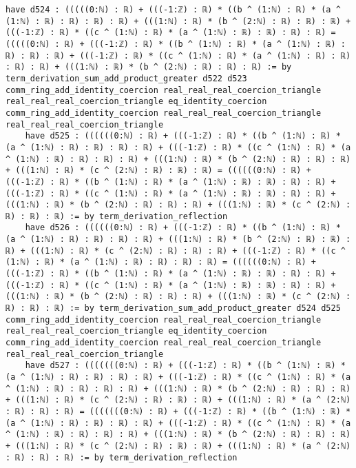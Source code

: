 \documentclass{article}
\begin{document}
\begin{tcolorbox}[colback=white!10, width=\linewidth]
\begin{lstlisting}[language=Lean4]
    have d524 : (((((0:ℕ) : ℝ) + (((-1:ℤ) : ℝ) * ((b ^ (1:ℕ) : ℝ) * (a ^ (1:ℕ) : ℝ) : ℝ) : ℝ) : ℝ) + (((1:ℕ) : ℝ) * (b ^ (2:ℕ) : ℝ) : ℝ) : ℝ) + (((-1:ℤ) : ℝ) * ((c ^ (1:ℕ) : ℝ) * (a ^ (1:ℕ) : ℝ) : ℝ) : ℝ) : ℝ) = (((((0:ℕ) : ℝ) + (((-1:ℤ) : ℝ) * ((b ^ (1:ℕ) : ℝ) * (a ^ (1:ℕ) : ℝ) : ℝ) : ℝ) : ℝ) + (((-1:ℤ) : ℝ) * ((c ^ (1:ℕ) : ℝ) * (a ^ (1:ℕ) : ℝ) : ℝ) : ℝ) : ℝ) + (((1:ℕ) : ℝ) * (b ^ (2:ℕ) : ℝ) : ℝ) : ℝ) := by term_derivation_sum_add_product_greater d522 d523 comm_ring_add_identity_coercion real_real_real_coercion_triangle real_real_real_coercion_triangle eq_identity_coercion comm_ring_add_identity_coercion real_real_real_coercion_triangle real_real_real_coercion_triangle
    have d525 : ((((((0:ℕ) : ℝ) + (((-1:ℤ) : ℝ) * ((b ^ (1:ℕ) : ℝ) * (a ^ (1:ℕ) : ℝ) : ℝ) : ℝ) : ℝ) + (((-1:ℤ) : ℝ) * ((c ^ (1:ℕ) : ℝ) * (a ^ (1:ℕ) : ℝ) : ℝ) : ℝ) : ℝ) + (((1:ℕ) : ℝ) * (b ^ (2:ℕ) : ℝ) : ℝ) : ℝ) + (((1:ℕ) : ℝ) * (c ^ (2:ℕ) : ℝ) : ℝ) : ℝ) = ((((((0:ℕ) : ℝ) + (((-1:ℤ) : ℝ) * ((b ^ (1:ℕ) : ℝ) * (a ^ (1:ℕ) : ℝ) : ℝ) : ℝ) : ℝ) + (((-1:ℤ) : ℝ) * ((c ^ (1:ℕ) : ℝ) * (a ^ (1:ℕ) : ℝ) : ℝ) : ℝ) : ℝ) + (((1:ℕ) : ℝ) * (b ^ (2:ℕ) : ℝ) : ℝ) : ℝ) + (((1:ℕ) : ℝ) * (c ^ (2:ℕ) : ℝ) : ℝ) : ℝ) := by term_derivation_reflection
    have d526 : ((((((0:ℕ) : ℝ) + (((-1:ℤ) : ℝ) * ((b ^ (1:ℕ) : ℝ) * (a ^ (1:ℕ) : ℝ) : ℝ) : ℝ) : ℝ) + (((1:ℕ) : ℝ) * (b ^ (2:ℕ) : ℝ) : ℝ) : ℝ) + (((1:ℕ) : ℝ) * (c ^ (2:ℕ) : ℝ) : ℝ) : ℝ) + (((-1:ℤ) : ℝ) * ((c ^ (1:ℕ) : ℝ) * (a ^ (1:ℕ) : ℝ) : ℝ) : ℝ) : ℝ) = ((((((0:ℕ) : ℝ) + (((-1:ℤ) : ℝ) * ((b ^ (1:ℕ) : ℝ) * (a ^ (1:ℕ) : ℝ) : ℝ) : ℝ) : ℝ) + (((-1:ℤ) : ℝ) * ((c ^ (1:ℕ) : ℝ) * (a ^ (1:ℕ) : ℝ) : ℝ) : ℝ) : ℝ) + (((1:ℕ) : ℝ) * (b ^ (2:ℕ) : ℝ) : ℝ) : ℝ) + (((1:ℕ) : ℝ) * (c ^ (2:ℕ) : ℝ) : ℝ) : ℝ) := by term_derivation_sum_add_product_greater d524 d525 comm_ring_add_identity_coercion real_real_real_coercion_triangle real_real_real_coercion_triangle eq_identity_coercion comm_ring_add_identity_coercion real_real_real_coercion_triangle real_real_real_coercion_triangle
    have d527 : (((((((0:ℕ) : ℝ) + (((-1:ℤ) : ℝ) * ((b ^ (1:ℕ) : ℝ) * (a ^ (1:ℕ) : ℝ) : ℝ) : ℝ) : ℝ) + (((-1:ℤ) : ℝ) * ((c ^ (1:ℕ) : ℝ) * (a ^ (1:ℕ) : ℝ) : ℝ) : ℝ) : ℝ) + (((1:ℕ) : ℝ) * (b ^ (2:ℕ) : ℝ) : ℝ) : ℝ) + (((1:ℕ) : ℝ) * (c ^ (2:ℕ) : ℝ) : ℝ) : ℝ) + (((1:ℕ) : ℝ) * (a ^ (2:ℕ) : ℝ) : ℝ) : ℝ) = (((((((0:ℕ) : ℝ) + (((-1:ℤ) : ℝ) * ((b ^ (1:ℕ) : ℝ) * (a ^ (1:ℕ) : ℝ) : ℝ) : ℝ) : ℝ) + (((-1:ℤ) : ℝ) * ((c ^ (1:ℕ) : ℝ) * (a ^ (1:ℕ) : ℝ) : ℝ) : ℝ) : ℝ) + (((1:ℕ) : ℝ) * (b ^ (2:ℕ) : ℝ) : ℝ) : ℝ) + (((1:ℕ) : ℝ) * (c ^ (2:ℕ) : ℝ) : ℝ) : ℝ) + (((1:ℕ) : ℝ) * (a ^ (2:ℕ) : ℝ) : ℝ) : ℝ) := by term_derivation_reflection

\end{lstlisting}
\end{tcolorbox}
\end{document}
